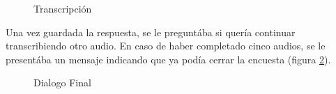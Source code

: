 \begin{figure}
\begin{center}
\end{center}
\caption{Transcripción}
\label{transcripcion}
\end{figure}

Una vez guardada la respuesta, se le preguntába si quería continuar transcribiendo otro audio. En caso de haber completado cinco audios, se le presentába un mensaje indicando que ya podía cerrar la encuesta (figura \ref{continuar}).

\begin{figure}
\begin{center}
\end{center}
\caption{Dialogo Final}
\label{continuar}
\end{figure}